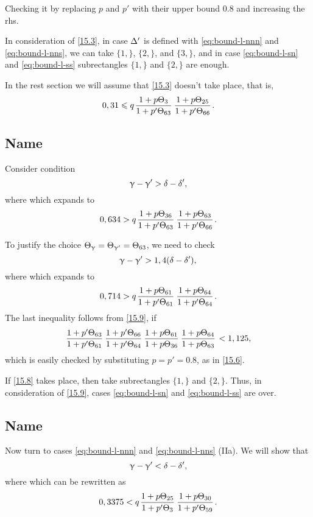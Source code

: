 Checking it by replacing $p$ and $p'$ with their upper bound 0.8 and increasing the rhs.

In consideration of \ref{15.3},
in case $\Delta'$ is defined with \ref{eq:bound-l-nnn} and \ref{eq:bound-l-nns},
we can take $\{1,\}$, $\{2,\}$, and $\{3,\}$,
and in case \ref{eq:bound-l-sn} and \ref{eq:bound-l-ss}
subrectangles $\{1,\}$ and $\{2,\}$ are enough.

In the rest section we will assume that \ref{15.3} doesn't take place, that is,
\begin{equation}\label{15.7}
	0,31 \leqslant q \up{3}{63} \up{25}{66}.
\end{equation}

\subsection{Name}

Consider condition
\begin{equation}\label{15.8}
	\upgamma - \upgamma' > \delta - \delta',
\end{equation}
where
which expands to
\begin{equation}\label{15.9}
	0,634 > q \up{36}{63} \up{63}{66}.
\end{equation}

To justify the choice $\Theta_{\upgamma} = \Theta_{\upgamma'} = \Theta_{63}$, we need to check
\begin{equation}\label{15.10}
	\upgamma - \upgamma' > 1,4 (\delta - \delta'),
\end{equation}
where
which expands to
\begin{equation}\label{15.11}
	0,714 > q\up{61}{61}\up{64}{64}.
\end{equation}
The last inequality follows from \ref{15.9}, if
\begin{equation}
	\pp{63}{61} \pp{66}{64} \uu{61}{36} \uu{64}{63} < 1,125,
\end{equation}
which is easily checked by substituting $p = p' = 0.8$, as in \ref{15.6}.

If \ref{15.8} takes place, then take subrectangles $\{1,\}$ and $\{2,\}$.
Thus, in consideration of \ref{15.9}, cases \ref{eq:bound-l-sn} and \ref{eq:bound-l-ss} are over.

\subsection{Name}

Now turn to cases \ref{eq:bound-l-nnn} and \ref{eq:bound-l-nns} (IIa).
We will show that
\begin{equation}\label{15.12}
	\upgamma - \upgamma' < \delta - \delta',
\end{equation}
where
which can be rewritten as
\begin{equation}\label{15.13}
	0,3375 < q \up{25}{3} \up{30}{59}.
\end{equation}

